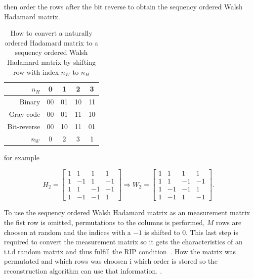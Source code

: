 then order the rows after the bit reverse to obtain the sequency ordered Walsh Hadamard matrix.

\begin{table}[H]
\begin{tabular}{|r|c|c|c|c|}
\hline
    $n_H$        & 0    & 1     & 2     & 3     \\ \hline
    Binary       & 00   & 01    & 10    & 11    \\ \hline
    Gray code    & 00   & 01    & 11    & 10    \\ \hline
    Bit-reverse  & 00   & 10    & 11    & 01    \\ \hline
    $n_W$        & 0    & 2     & 3     & 1     \\ \hline
    
\end{tabular}
\label{tab:Hadamard_2_Walsh}
\caption{How to convert a naturally ordered Hadamard matrix to a sequency ordered Walsh Hadamard matrix by shifting row with index $n_W$ to $n_H$}
\end{table}

for example

\begin{equation}
    H_2 =  \begin{bmatrix}
       1 & 1 & 1 & 1 \\
       1 & -1 & 1 & -1 \\
       1 & 1 & -1 & -1 \\
       1 & -1 & -1 & 1 
       \end{bmatrix} \Rightarrow W_2 = \begin{bmatrix}
       1 & 1 & 1 & 1 \\
       1 & 1 & -1 & -1  \\
       1 & -1 & -1 & 1  \\
       1 & -1 & 1 & -1 
       \end{bmatrix}.
\end{equation}

To use the sequency ordered Walsh Hadamard matrix as an measurement matrix the fist row is omitted, permutations to the columns is performed, $M$ rows are choosen at random and the indices with a $-1$ is shifted to $0$. This last step is required to convert the measurement matrix so it gets the characteristics of an i.i.d random matrix and thus fulfill the RIP condition~\cite{article:SRM_long, article:WH_RIP_SRM, article:WH_mixed_RIP_prof}. How the matrix was permutated and which rows was choosen i which order is stored so the reconstruction algorithm can use that information. \cite{article:SRM_long, article:TVAL3, article:an_improved_WH_matrix}. 


